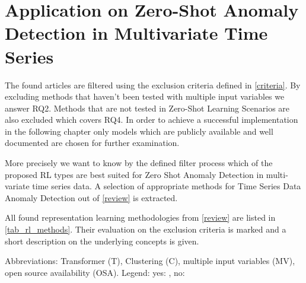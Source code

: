 \section{Application on Zero-Shot Anomaly Detection in Multivariate Time Series}\label{application}
The found articles are filtered using the exclusion criteria defined in \autoref{criteria}. By excluding methods that haven't been tested with multiple input variables we answer RQ2. Methods that are not tested in Zero-Shot Learning Scenarios are also excluded which covers RQ4.  In order to achieve a successful implementation in the following chapter only models which are publicly available and well documented are chosen for further examination.

More precisely we want to know by the defined filter process which of the proposed RL types are best suited for Zero Shot Anomaly Detection in multi-variate time series data. A selection of appropriate methods for Time Series Data Anomaly Detection out of \autoref{review} is extracted.

All found representation learning methodologies from \autoref{review} are listed in \autoref{tab_rl_methods}. Their evaluation on the exclusion criteria is marked and a short description on the underlying concepts is given.
 \begin{table}
   \caption{Abbreviations: Transformer (T), Clustering (C), multiple input variables (MV), open source availability (OSA). Legend: yes: \cmark, no: \xmark}\label{tab_rl_methods}
   
 \end{table}
